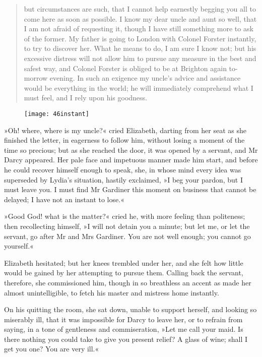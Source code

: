\begin{quotation}
but circumstances are such, that I cannot help earnestly begging you all to come here as soon as possible. I know my dear uncle and aunt so well, that I am not afraid of requesting it, though I have still something more to ask of the former. My father is going to London with Colonel Forster instantly, to try to discover her. What he means to do, I am sure I know not; but his excessive distress will not allow him to pursue any measure in the best and safest way, and Colonel Forster is obliged to be at Brighton again to-morrow evening. In such an exigence my uncle's advice and assistance would be everything in the world; he will immediately comprehend what I must feel, and I rely upon his goodness.
\end{quotation}


\begin{figure}[tbh]
\centering
\texttt{[image: 46instant]}
\end{figure}

»Oh! where, where is my uncle?« cried Elizabeth, darting from her seat as she finished the letter, in eagerness to follow him, without losing a moment of the time so precious; but as she reached the door, it was opened by a servant, and Mr Darcy appeared. Her pale face and impetuous manner made him start, and before he could recover himself enough to speak, she, in whose mind every idea was superseded by Lydia's situation, hastily exclaimed, »I beg your pardon, but I must leave you. I must find Mr Gardiner this moment on business that cannot be delayed; I have not an instant to lose.«

»Good God! what is the matter?« cried he, with more feeling than politeness; then recollecting himself, »I will not detain you a minute; but let me, or let the servant, go after Mr and Mrs Gardiner. You are not well enough; you cannot go yourself.«

Elizabeth hesitated; but her knees trembled under her, and she felt how little would be gained by her attempting to pursue them. Calling back the servant, therefore, she commissioned him, though in so breathless an accent as made her almost unintelligible, to fetch his master and mistress home instantly.

On his quitting the room, she sat down, unable to support herself, and looking so miserably ill, that it was impossible for Darcy to leave her, or to refrain from saying, in a tone of gentleness and commiseration, »Let me call your maid. Is there nothing you could take to give you present relief? A glass of wine; shall I get you one? You are very ill.«


